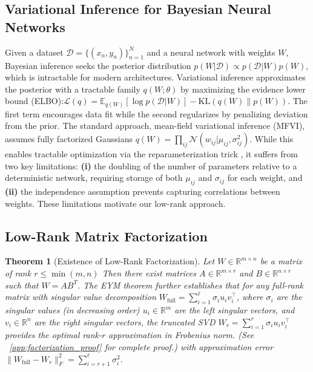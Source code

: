 \documentclass{article}
\theoremstyle{plain}
\newtheorem{theorem}{Theorem}[section]
\theoremstyle{definition}
\theoremstyle{remark}
\begin{document}
\subsection{Variational Inference for Bayesian Neural Networks} \label{sec:background:vi}  Given a dataset $\mathcal{D} = \{(x_n, y_n)\}_{n=1}^N$ and a neural network  with weights $W$, Bayesian inference seeks the posterior distribution  $p(W|\mathcal{D}) \propto p(\mathcal{D}|W)p(W)$, which is intractable for  modern architectures. Variational inference  approximates the posterior with a tractable family $q(W;\theta)$ by maximizing  the evidence lower bound (ELBO):$\mathcal{L}(q) = \mathbb{E}_{q(W)}[\log p(\mathcal{D}|W)] - \mathrm{KL}(q(W) \| p(W)).$ The first term encourages data fit while the second regularizes by penalizing  deviation from the prior. The standard approach, mean-field variational inference (MFVI), assumes fully factorized Gaussians  $q(W) = \prod_{ij} \mathcal{N}(w_{ij}|\mu_{ij}, \sigma_{ij}^2)$. While this  enables tractable optimization via the reparameterization trick  \cite{kingma2014auto}, it suffers from two key limitations: \textbf{(i)} the doubling of the  number of parameters relative to a deterministic network, requiring storage of  both $\mu_{ij}$ and $\sigma_{ij}$ for each weight, and \textbf{(ii)} the independence  assumption prevents capturing correlations between weights. These limitations  motivate our low-rank approach. \subsection{Low-Rank Matrix Factorization} \label{sec:background:factorization}  \begin{theorem}[Existence of Low-Rank Factorization] \label{thm:lowrank_existence} Let $W \in \mathbb{R}^{m \times n}$  be a matrix of rank $r \leq \min(m,n)$ Then there exist matrices $A \in \mathbb{R}^{m \times r}$ and $B \in \mathbb{R}^{n \times r}$ such that $W = A B^T $\cite{ford2014numerical}.  The EYM theorem further establishes  that for any full-rank matrix with singular value decomposition  $W_{\text{full}} = \sum_{i=1}^{\ell} \sigma_i u_i v_i^\top$, where  $\sigma_i$ are the singular values (in decreasing order) $u_i \in \mathbb{R}^m$ are the left singular vectors, and $v_i \in \mathbb{R}^n$ are the right singular vectors,  the truncated SVD $W_r =\sum_{i=1}^{r} \sigma_i u_i v_i^\top$ provides the optimal rank-$r$ approximation in Frobenius norm. (See ~\ref{app:factorization_proof} for complete proof.)  with approximation error $\|W_{\text{full}} - W_r\|_F^2 = \sum_{i=r+1}^{\ell} \sigma_i^2$. 
\end{theorem}
\end{document}
